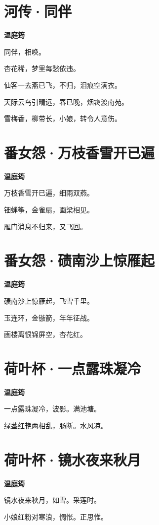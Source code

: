 \documentclass[12pt,a4paper]{ctexbook}
\begin{document}
\section{河传·同伴}
\textbf{温庭筠}\par\vspace{0.5em}
同伴，相唤。\par
杏花稀，梦里每愁依违。\par
仙客一去燕已飞，不归，泪痕空满衣。\par
天际云鸟引晴远，春已晚，烟霭渡南苑。\par
雪梅香，柳带长，小娘，转令人意伤。\par

\section{番女怨·万枝香雪开已遍}
\textbf{温庭筠}\par\vspace{0.5em}
万枝香雪开已遍，细雨双燕。\par
钿蝉筝，金雀扇，画梁相见。\par
雁门消息不归来，又飞回。\par

\section{番女怨·碛南沙上惊雁起}
\textbf{温庭筠}\par\vspace{0.5em}
碛南沙上惊雁起，飞雪千里。\par
玉连环，金镞箭，年年征战。\par
画楼离恨锦屏空，杏花红。\par

\section{荷叶杯·一点露珠凝冷}
\textbf{温庭筠}\par\vspace{0.5em}
一点露珠凝冷，波影。满池塘。\par
绿茎红艳两相乱，肠断。水风凉。\par

\section{荷叶杯·镜水夜来秋月}
\textbf{温庭筠}\par\vspace{0.5em}
镜水夜来秋月，如雪。采莲时。\par
小娘红粉对寒浪，惆怅。正思惟。\par
\end{document}
